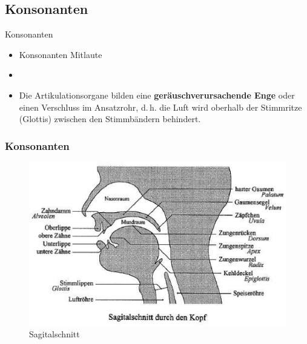 %
\subsection{Konsonanten}

\begin{frame}{Konsonanten}

	\begin{itemize}
		\item Konsonanten \ras Mitlaute
		\item[]
		\item Die Artikulationsorgane bilden eine \textbf{geräuschverursachende Enge} oder einen Verschluss im Ansatzrohr, d.\,h. die Luft wird oberhalb der Stimmritze (Glottis) zwischen den Stimmbändern behindert.
	\end{itemize}
	
\end{frame}



\begin{frame}
\frametitle{Konsonanten}

	\begin{figure}[H]
		\centering
		
		\includegraphics[scale=0.65]{material/04sagitalschnittaltmann}
		\caption{Sagitalschnitt \citep{Altmann&Co07a}}
	\end{figure}
	
\end{frame}



